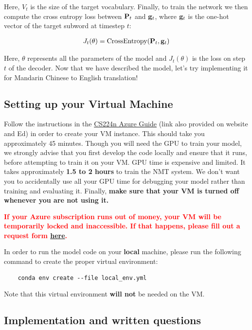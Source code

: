 Here, $V_{t}$ is the size of the target vocabulary. Finally, to train the network we then compute the cross entropy loss between $\mathbf{P}_t$ and $\mathbf{g}_{t}$, where $\mathbf{g}_{t}$ is the one-hot vector of the target subword at timestep $t$:

\begin{align}
    J_t(\theta) = \mathrm{CrossEntropy}(\mathbf{P}_t,\mathbf{g}_{t})
\end{align}

Here, $\theta$ represents all the parameters of the model and $J_t(\theta)$ is the loss on step $t$ of the decoder.
Now that we have described the model, let's try implementing it for Mandarin Chinese to English translation!

\subsection*{Setting up your Virtual Machine}
Follow the instructions in the \href{https://docs.google.com/document/d/11kRyfClhTi4-MC1feWWCMI31fHpTzddASsDa48_Dd9E/edit?usp=sharing}{CS224n Azure Guide} (link also provided on website and Ed) in order to create your VM instance. This should take you approximately 45 minutes. Though you will need the GPU to train your model, we strongly advise that you first develop the code locally and ensure that it runs, before attempting to train it on your VM. GPU time is expensive and limited. It takes approximately \textbf{1.5 to 2 hours} to train the NMT system. We don't want you to accidentally use all your GPU time for debugging your model rather than training and evaluating it. Finally, \textbf{make sure that your VM is turned off whenever you are not using it.}

\textbf{\textcolor{red}{If your Azure subscription runs out of money, your VM will be temporarily locked and inaccessible. If that happens, please fill out a request form \href{https://forms.gle/PUwiA1rR5aQNWxYt6}{here}.}}

In order to run the model code on your \textbf{local} machine, please run the following command to create the proper virtual environment:

\begin{lstlisting}
    conda env create --file local_env.yml
\end{lstlisting}

Note that this virtual environment \textbf{will not} be needed on the VM.\newline

\subsection*{Implementation and written questions}

